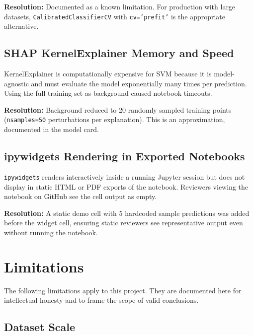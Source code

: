 \documentclass[12pt, a4paper]{report}
\newcommand{\code}[1]{\texttt{\small\textcolor{primary}{#1}}}
\begin{document}
\textbf{Resolution:} Documented as a known limitation. For production with large
datasets, \code{CalibratedClassifierCV} with \code{cv='prefit'} is the appropriate
alternative.

\section{SHAP KernelExplainer Memory and Speed}

KernelExplainer is computationally expensive for SVM because it is model-agnostic
and must evaluate the model exponentially many times per prediction. Using the full
training set as background caused notebook timeouts.

\textbf{Resolution:} Background reduced to 20 randomly sampled training points
(\code{nsamples=50} perturbations per explanation). This is an approximation, documented
in the model card.

\section{ipywidgets Rendering in Exported Notebooks}

\code{ipywidgets} renders interactively inside a running Jupyter session but does not
display in static HTML or PDF exports of the notebook. Reviewers viewing the notebook on
GitHub see the cell output as empty.

\textbf{Resolution:} A static demo cell with 5 hardcoded sample predictions was added
before the widget cell, ensuring static reviewers see representative output even without
running the notebook.

\chapter{Limitations}

\begin{warningbox}
The following limitations apply to this project. They are documented here for
intellectual honesty and to frame the scope of valid conclusions.
\end{warningbox}

\section{Dataset Scale}
\end{document}
